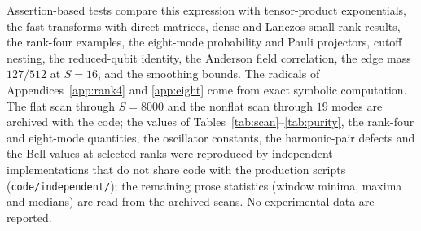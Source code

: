 \documentclass[11pt,a4paper]{article}
\begin{document}
Assertion-based tests compare this expression with tensor-product exponentials, the fast transforms with direct matrices, dense and Lanczos small-rank results, the rank-four examples, the eight-mode probability and Pauli projectors, cutoff nesting, the reduced-qubit identity, the Anderson field correlation, the edge mass $127/512$ at $S=16$, and the smoothing bounds. The radicals of Appendices~\ref{app:rank4} and \ref{app:eight} come from exact symbolic computation. The flat scan through $S=8000$ and the nonflat scan through $19$ modes are archived with the code; the values of Tables~\ref{tab:scan}--\ref{tab:purity}, the rank-four and eight-mode quantities, the oscillator constants, the harmonic-pair defects and the Bell values at selected ranks were reproduced by independent implementations that do not share code with the production scripts (\texttt{code/independent/}); the remaining prose statistics (window minima, maxima and medians) are read from the archived scans. No experimental data are reported.
\end{document}
